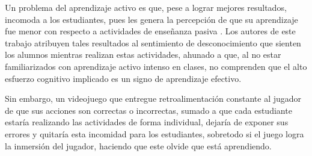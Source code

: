 \documentclass[submission]{eptcs}
\begin{document}
Un problema del aprendizaje activo es que, pese a lograr mejores resultados, incomoda a los estudiantes, pues les
genera la percepción de que su aprendizaje fue menor con respecto a actividades de enseñanza pasiva \cite{active_learning_versus_feeling_of_learning}.
Los autores de este trabajo atribuyen tales resultados al sentimiento de desconocimiento que sienten los alumnos mientras realizan estas actividades,
ahunado a que, al no estar familiarizados con aprendizaje activo intenso en clases, no comprenden que
el alto esfuerzo cognitivo implicado es un signo de aprendizaje efectivo.

Sin embargo, un videojuego que entregue retroalimentación constante al jugador de que sus acciones
son correctas o incorrectas, sumado a que cada estudiante estaría realizando las actividades
de forma individual, dejaría de exponer sus errores y quitaría esta incomidad para los estudiantes,
sobretodo si el juego logra la inmersión del jugador, haciendo que este olvide que está aprendiendo.




\end{document}
